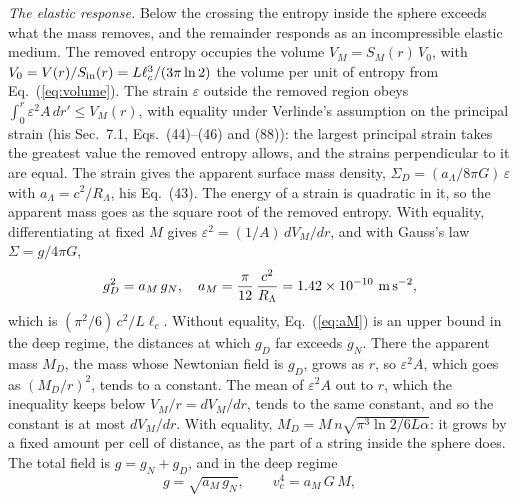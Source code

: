\documentclass[aps,prd,twocolumn,superscriptaddress,nofootinbib,showkeys]{revtex4-2}
\newcommand{\lc}{\ell_c}
\newcommand{\RL}{R_\Lambda}
\begin{document}
\textit{The elastic response.} Below the crossing the entropy inside the sphere exceeds what the mass removes, and the remainder responds as an incompressible elastic medium. The removed entropy occupies the volume $V_M = S_M(r)\,V_0$, with $V_0 = V(r)/S_{\rm in}(r) = L\lc^3/(3\pi\ln2)$ the volume per unit of entropy from Eq.~(\ref{eq:volume}). The strain $\varepsilon$ outside the removed region obeys $\int_0^r \varepsilon^2 A\,dr' \le V_M(r)$, with equality under Verlinde's assumption on the principal strain (his Sec.~7.1, Eqs.~(44)--(46) and (88)): the largest principal strain takes the greatest value the removed entropy allows, and the strains perpendicular to it are equal. The strain gives the apparent surface mass density, $\Sigma_D = (a_\Lambda/8\pi G)\,\varepsilon$ with $a_\Lambda = c^2/\RL$, his Eq.~(43). The energy of a strain is quadratic in it, so the apparent mass goes as the square root of the removed entropy. With equality, differentiating at fixed $M$ gives $\varepsilon^2 = (1/A)\,dV_M/dr$, and with Gauss's law $\Sigma = g/4\pi G$,
\begin{equation}
g_D^2 = a_M\,g_N, \quad a_M = \frac{\pi}{12}\,\frac{c^2}{\RL} = 1.42\times10^{-10}~{\rm m\,s^{-2}} ,
\label{eq:aM}
\end{equation}
which is $(\pi^2/6)\,c^2/L\lc$. Without equality, Eq.~(\ref{eq:aM}) is an upper bound in the deep regime, the distances at which $g_D$ far exceeds $g_N$. There the apparent mass $M_D$, the mass whose Newtonian field is $g_D$, grows as $r$, so $\varepsilon^2A$, which goes as $(M_D/r)^2$, tends to a constant. The mean of $\varepsilon^2A$ out to $r$, which the inequality keeps below $V_M/r = dV_M/dr$, tends to the same constant, and so the constant is at most $dV_M/dr$. With equality, $M_D = M\,n\sqrt{\pi^3\ln2/6L\alpha}$: it grows by a fixed amount per cell of distance, as the part of a string inside the sphere does. The total field is $g = g_N + g_D$, and in the deep regime
\begin{equation}
g = \sqrt{a_M\,g_N},\qquad v_c^4 = a_M\,G\,M ,
\label{eq:btfr}
\end{equation}
\end{document}
